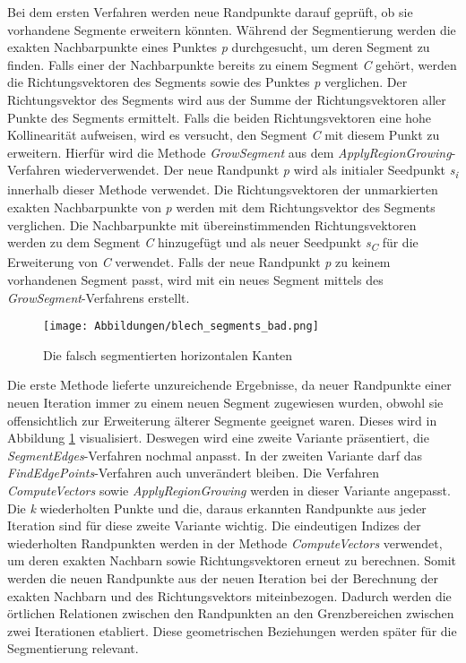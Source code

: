 Bei dem ersten Verfahren werden neue Randpunkte darauf geprüft, ob sie vorhandene Segmente erweitern könnten. Während der Segmentierung werden die exakten Nachbarpunkte eines Punktes \textit{p} durchgesucht, um deren Segment zu finden. Falls einer der Nachbarpunkte bereits zu einem Segment \textit{C} gehört, werden die Richtungsvektoren des Segments sowie des Punktes \textit{p} verglichen. Der Richtungsvektor des Segments wird aus der Summe der Richtungsvektoren aller Punkte des Segments ermittelt. Falls die beiden Richtungsvektoren eine hohe Kollinearität aufweisen, wird es versucht, den Segment \textit{C} mit diesem Punkt zu erweitern. Hierfür wird die Methode \textit{GrowSegment} aus dem \textit{ApplyRegionGrowing}-Verfahren wiederverwendet. Der neue Randpunkt \textit{p} wird als initialer Seedpunkt \textit{s\textsubscript{i}} innerhalb dieser Methode verwendet. Die Richtungsvektoren der unmarkierten exakten Nachbarpunkte von \textit{p} werden mit dem Richtungsvektor des Segments verglichen. Die Nachbarpunkte mit übereinstimmenden Richtungsvektoren werden zu dem Segment \textit{C} hinzugefügt und als neuer Seedpunkt \textit{s\textsubscript{C}} für die Erweiterung von \textit{C} verwendet. Falls der neue Randpunkt \textit{p} zu keinem vorhandenen Segment passt, wird mit ein neues Segment mittels des \textit{GrowSegment}-Verfahrens erstellt.

\begin{figure}[b!]
	\texttt{[image: Abbildungen/blech\_segments\_bad.png]}
	\centering
	\caption{Die falsch segmentierten horizontalen Kanten}
	\label{fig: bad_segments}
\end{figure}

Die erste Methode lieferte unzureichende Ergebnisse, da neuer Randpunkte einer neuen Iteration immer zu einem neuen Segment zugewiesen wurden, obwohl sie offensichtlich zur Erweiterung älterer Segmente geeignet waren. Dieses wird in Abbildung \ref{fig: bad_segments} visualisiert. Deswegen wird eine zweite Variante präsentiert, die \textit{SegmentEdges}-Verfahren nochmal anpasst. In der zweiten Variante darf das \textit{FindEdgePoints}-Verfahren auch unverändert bleiben. Die Verfahren \textit{ComputeVectors} sowie \textit{ApplyRegionGrowing} werden in dieser Variante angepasst. Die \textit{k} wiederholten Punkte und die, daraus erkannten Randpunkte aus jeder Iteration sind für diese zweite Variante wichtig. Die eindeutigen Indizes der wiederholten Randpunkten werden in der Methode \textit{ComputeVectors} verwendet, um deren exakten Nachbarn sowie Richtungsvektoren erneut zu berechnen. Somit werden die neuen Randpunkte aus der neuen Iteration bei der Berechnung der exakten Nachbarn und des Richtungsvektors miteinbezogen. Dadurch werden die örtlichen Relationen zwischen den Randpunkten an den Grenzbereichen zwischen zwei Iterationen etabliert. Diese geometrischen Beziehungen werden später für die Segmentierung relevant.

